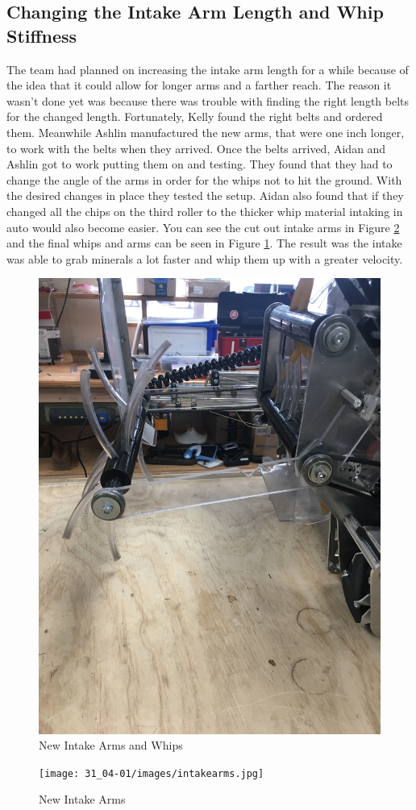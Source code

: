 \documentclass{article}
\begin{document}
\subsection{Changing the Intake Arm Length and Whip Stiffness}
The team had planned on increasing the intake arm length for a while because of the idea that it could allow for longer arms and a farther reach. The reason it wasn't done yet was because there was trouble with finding the right length belts for the changed length. Fortunately, Kelly found the right belts and ordered them. Meanwhile Ashlin manufactured the new arms, that were one inch longer, to work with the belts when they arrived. Once the belts arrived, Aidan and Ashlin got to work putting them on and testing. They found that they had to change the angle of the arms in order for the whips not to hit the ground. With the desired changes in place they tested the setup. Aidan also found that if they changed all the chips on the third roller to the thicker whip material intaking in auto would also become easier. You can see the cut out intake arms in Figure \ref{fig:intakearms} and the final whips and arms can be seen in Figure \ref{fig:arms}. The result was the intake was able to grab minerals a lot faster and whip them up with a greater velocity.

\begin{figure}
    \centering
    \includegraphics[width= 0.5 \textwidth]{31_04-01/images/IMG_1934.JPG}
    \caption{New Intake Arms and Whips}
    \label{fig:arms}
\end{figure}

\begin{figure}
    \centering
    \texttt{[image: 31\_04-01/images/intakearms.jpg]}
    \caption{New Intake Arms}
    \label{fig:intakearms}
\end{figure}
\end{document}

